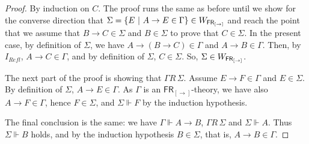 \documentclass[12pt]{article}
\newtheorem{dfn}[thm]{Definition}
\begin{document}
\begin{proof}
By induction on $C$.
The proof runs the same as before  until we show for the converse direction that $ \Sigma = \left\lbrace  E ~|~A\rightarrow E \in\Gamma\right\rbrace\in W_{{\sf FR_{[\rightarrow]}}}$ and reach the point
that we assume that $ B\rightarrow C \in \Sigma$ and $ B \in \Sigma$ to prove that $C\in\Sigma$.
In the present case, by definition of $  \Sigma $, we have $A\rightarrow (B\rightarrow C) \in \Gamma $ and $A\rightarrow B \in \Gamma $. Then, by $ I_{Refl} $, $A\rightarrow C \in \Gamma $, and by definition of $  \Sigma $, $C \in  \Sigma $. So,  $ \Sigma \in W_{{\sf FR_{[\rightarrow]}}}$.

The next part of the proof is showing that $  \Gamma R\,  \Sigma $. Assume $ E\rightarrow F \in \Gamma $ and $ E \in \Sigma $. By definition of $ \Sigma $, $ A \rightarrow E \in \Gamma $. As $ \Gamma $ is an $\mathsf{FR_{[\rightarrow]}} $-theory, we have also $ A\rightarrow F \in \Gamma$, hence $F\in\Sigma$, and $ \Sigma \Vdash F$ by the induction hypothesis. 

The final conclusion is the same: we have  $  \Gamma\Vdash A\rightarrow B $, $  \Gamma R \, \Sigma $ and  $ \Sigma \Vdash A$. Thus  $ \Sigma \Vdash B$ holds, and by the induction hypothesis $ B \in \Sigma $, that is, $A\rightarrow B \in    \Gamma$.
\end{proof}


\end{document}
